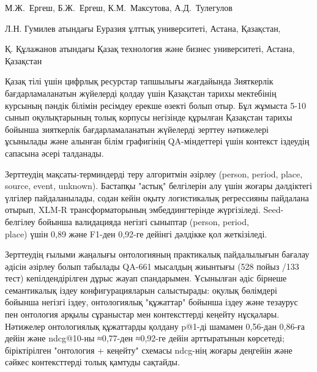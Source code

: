 
\begin{header}

М.Ж.~Ергеш\envelope,
Б.Ж.~Ергеш\envelope,
К.М.~Максутова,
А.Д.~Тулегулов
\end{header}

\begin{affil}
Л.Н. Гумилев атындағы Еуразия ұлттық университеті, Астана, Қазақстан,

Қ. Құлажанов атындағы Қазақ технология және бизнес университеті, Астана, Қазақстан

\end{affil}

Қазақ тілі үшін цифрлық ресурстар тапшылығы жағдайында Зияткерлік
бағдарламаланатын жүйелерді қолдау үшін Қазақстан тарихы мектебінің
курсының пәндік білімін ресімдеу ерекше өзекті болып отыр. Бұл жұмыста
5-10 сынып оқулықтарының толық корпусы негізінде құрылған Қазақстан
тарихы бойынша зияткерлік бағдарламаланатын жүйелерді зерттеу нәтижелері
ұсынылады және алынған білім графигінің QA-міндеттері үшін контекст
іздеудің сапасына әсері талданады.

Зерттеудің мақсаты-терминдерді теру алгоритмін әзірлеу (person, period,
place, source, event, un\-known). Бастапқы "астық" белгілерін алу үшін
жоғары дәлдіктегі үлгілер пайдаланылады, содан кейін оқыту логистикалық
регрессияны пайдалана отырып, XLM-R трансформаторының эмбеддингтерінде
жүргізіледі. Seed-белгілеу бойынша валидацияда негізгі сыныптар (person,
period, \\place) үшін 0,89 және F1-ден 0,92-ге дейінгі дәлдікке қол
жеткізіледі.

Зерттеудің ғылыми жаңалығы онтологияның практикалық пайдалылығын бағалау
әдісін әзірлеу болып табылады QA-661 мысалдың жиынтығы (528 пойыз /133
тест) кепілдендірілген дұрыс жауап спандарымен. Ұсынылған әдіс бірнеше
семантикалық іздеу конфигурацияларын салыстырады: оқулық бөлімдері
бойынша негізгі іздеу, онтологиялық "құжаттар" бойынша іздеу және
тезаурус пен онтология арқылы сұраныстар мен контексттерді кеңейту
нұсқалары. Нәтижелер онтологиялық құжаттарды қолдану p@1-ді шамамен
0,56-дан 0,86-ға дейін және ndcg@10-ны ≈0,77-ден ≈0,92-ге дейін
арттыратынын көрсетеді; біріктірілген "онтология + кеңейту" схемасы
ndcg-нің жоғары деңгейін және сәйкес контексттерді толық қамтуды
сақтайды.

